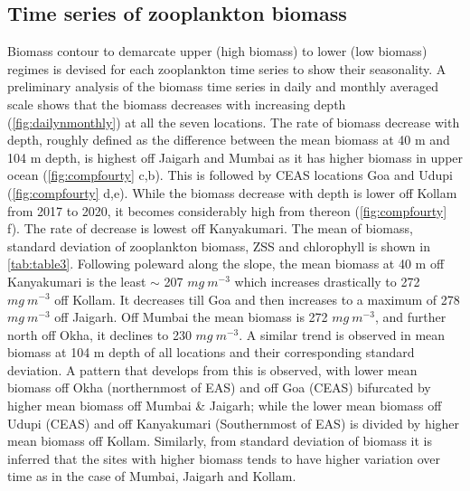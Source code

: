 \documentclass{article}
\begin{document}
	\subsection{Time series of zooplankton biomass}
	Biomass contour to demarcate upper (high biomass) to lower (low biomass) regimes is devised for each zooplankton time series to show their seasonality. A preliminary analysis of the biomass time series in daily and monthly averaged scale shows that the biomass decreases with increasing depth (\cref{fig:dailynmonthly}) at all the seven locations. The rate of biomass decrease with depth, roughly defined as the difference between the mean biomass at 40 m  and 104 m depth, is highest off Jaigarh and Mumbai as it has higher biomass in upper ocean (\cref{fig:compfourty} c,b). This is followed by CEAS locations Goa and Udupi (\cref{fig:compfourty} d,e). While the biomass decrease with depth is lower off Kollam from 2017 to 2020, it becomes considerably high from thereon (\cref{fig:compfourty} f). The rate of decrease is lowest off Kanyakumari. The mean of biomass, standard deviation of zooplankton biomass, ZSS and chlorophyll is shown in \autoref{tab:table3}. Following poleward along the slope, the mean biomass at 40 m off Kanyakumari is the least $\sim$ 207 $mg\ m^{-3}$ which increases drastically to 272 $mg\ m^{-3}$ off Kollam. It decreases till Goa and then increases to a maximum of 278 $mg\ m^{-3}$ off Jaigarh. Off Mumbai the mean biomass is 272 $mg\ m^{-3}$, and further north off Okha, it declines to 230 $mg\ m^{-3}$. A similar trend is observed in mean biomass at 104 m depth of all locations and their corresponding standard deviation. A pattern that develops from this is observed, with lower mean biomass off Okha (northernmost of EAS) and off Goa (CEAS) bifurcated by higher mean biomass off Mumbai \& Jaigarh; while the lower mean biomass off Udupi (CEAS) and off Kanyakumari (Southernmost of EAS) is divided by higher mean biomass off Kollam. Similarly, from standard deviation of biomass it is inferred that the sites with higher biomass tends to have higher variation over time as in the case of Mumbai, Jaigarh and Kollam. 
	
\end{document}
